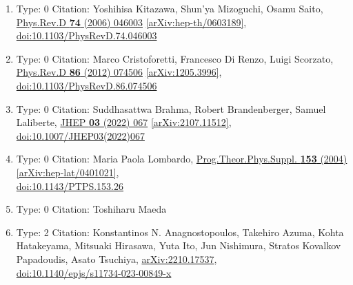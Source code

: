 \documentclass[a4paper,10pt]{article}
\begin{document}
\begin{enumerate}
\begin{enumerate}
  \item Type: 0 Citation: Yoshihisa Kitazawa, Shun'ya Mizoguchi, Osamu Saito, \href{https://www.doi.org/10.1103/PhysRevD.74.046003}{Phys.Rev.D {\bf 74} (2006) 046003}  \href{https://arxiv.org/abs/hep-th/0603189}{[arXiv:hep-th/0603189]},\\\href{https://www.doi.org/10.1103/PhysRevD.74.046003}{doi:10.1103/PhysRevD.74.046003}
  \item Type: 0 Citation: Marco Cristoforetti, Francesco Di Renzo, Luigi Scorzato, \href{https://www.doi.org/10.1103/PhysRevD.86.074506}{Phys.Rev.D {\bf 86} (2012) 074506}  \href{https://arxiv.org/abs/1205.3996}{[arXiv:1205.3996]},\\\href{https://www.doi.org/10.1103/PhysRevD.86.074506}{doi:10.1103/PhysRevD.86.074506}
  \item Type: 0 Citation: Suddhasattwa Brahma, Robert Brandenberger, Samuel Laliberte, \href{https://www.doi.org/10.1007/JHEP03(2022)067}{JHEP {\bf 03} (2022) 067}  \href{https://arxiv.org/abs/2107.11512}{[arXiv:2107.11512]},\\\href{https://www.doi.org/10.1007/JHEP03(2022)067}{doi:10.1007/JHEP03(2022)067}
  \item Type: 0 Citation: Maria Paola Lombardo, \href{https://www.doi.org/10.1143/PTPS.153.26}{Prog.Theor.Phys.Suppl. {\bf 153} (2004) }  \href{https://arxiv.org/abs/hep-lat/0401021}{[arXiv:hep-lat/0401021]},\\\href{https://www.doi.org/10.1143/PTPS.153.26}{doi:10.1143/PTPS.153.26}
  \item Type: 0 Citation: Toshiharu Maeda
  \item Type: 2 Citation: Konstantinos N. Anagnostopoulos, Takehiro Azuma, Kohta Hatakeyama, Mitsuaki Hirasawa, Yuta Ito, Jun Nishimura, Stratos Kovalkov Papadoudis, Asato Tsuchiya, \href{https://arxiv.org/abs/2210.17537}{arXiv:2210.17537},\\\href{https://www.doi.org/10.1140/epjs/s11734-023-00849-x}{doi:10.1140/epjs/s11734-023-00849-x}

\end{enumerate}
\end{enumerate}
\end{document}
